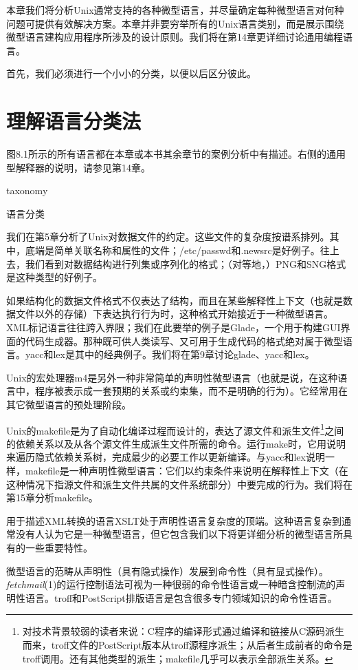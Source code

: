 \documentclass[12pt,oneside]{ctexbook}
\begin{document}
\begin{common-format}
本章我们将分析Unix通常支持的各种微型语言，并尽量确定每种微型语言对何种问题可提供有效解决方案。本章并非要穷举所有的Unix语言类别，而是展示围绕微型语言建构应用程序所涉及的设计原则。我们将在第14章更详细讨论通用编程语言。

首先，我们必须进行一个小小的分类，以便以后区分彼此。

\section{理解语言分类法}
图8.1所示的所有语言都在本章或本书其余章节的案例分析中有描述。右侧的通用型解释器的说明，请参见第14章。

\begin{linefig}{taxonomy}
\caption{语言分类}
\label{fig:taxonomy}
\end{linefig}

我们在第5章分析了Unix对数据文件的约定。这些文件的复杂度按谱系排列。其中，底端是简单关联名称和属性的文件；/etc/passwd和.newsrc是好例子。往上去，我们看到对数据结构进行列集或序列化的格式；（对等地，）PNG和SNG格式是这种类型的好例子。

如果结构化的数据文件格式不仅表达了结构，而且在某些解释性上下文（也就是数据文件以外的存储）下表达执行行为时，这种格式开始接近于一种微型语言。XML标记语言往往跨入界限；我们在此要举的例子是Glade，一个用于构建GUI界面的代码生成器。那种既可供人类读写、又可用于生成代码的格式绝对属于微型语言。yacc和lex是其中的经典例子。我们将在第9章讨论glade、yacc和lex。

Unix的宏处理器m4是另外一种非常简单的声明性微型语言（也就是说，在这种语言中，程序被表示成一套预期的关系或约束集，而不是明确的行为）。它经常用在其它微型语言的预处理阶段。

Unix的makefile是为了自动化编译过程而设计的，表达了源文件和派生文件\footnote{对技术背景较弱的读者来说：C程序的编译形式通过编译和链接从C源码派生而来，troff文件的PostScript版本从troff源程序派生；从后者生成前者的命令是troff调用。还有其他类型的派生；makefile几乎可以表示全部派生关系。}之间的依赖关系以及从各个源文件生成派生文件所需的命令。运行make时，它用说明来遍历隐式依赖关系树，完成最少的必要工作以更新编译。与yacc和lex说明一样，makefile是一种声明性微型语言：它们以约束条件来说明在解释性上下文（在这种情况下指源文件和派生文件共属的文件系统部分）中要完成的行为。我们将在第15章分析makefile。

用于描述XML转换的语言XSLT处于声明性语言复杂度的顶端。这种语言复杂到通常没有人认为它是一种微型语言，但它包含我们以下将更详细分析的微型语言所具有的一些重要特性。

微型语言的范畴从声明性（具有隐式操作）发展到命令性（具有显式操作）。\textit{fetchmail}(1)的运行控制语法可视为一种很弱的命令性语言或一种暗含控制流的声明性语言。troff和PostScript排版语言是包含很多专门领域知识的命令性语言。


\end{common-format}
\end{document}
